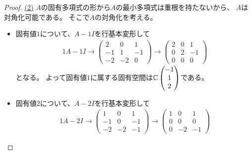 \documentclass[report]{jlreq}
\begin{document}
\begin{proof}
    \uline{(2)} \quad
    $A$の固有多項式の形から$A$の最小多項式は重根を持たないから、
    $A$は対角化可能である。
    そこで$A$の対角化を考える。
    \begin{itemize}
        \item 固有値$1$について、$A - 1I$を行基本変形して
            \begin{alignat}{1}
                A - 1I
                    \rightarrow
                        \begin{pmatrix}
                            2 & 0 & 1 \\
                            -1 & 1 & -1 \\
                            -2 & -2 & 0
                        \end{pmatrix}
                    \rightarrow
                        \begin{pmatrix}
                            2 & 0 & 1 \\
                            0 & 2 & -1 \\
                            0 & 0 & 0
                        \end{pmatrix}
            \end{alignat}
            となる。
            よって固有値$1$に属する固有空間は$\mathbb{C} \begin{pmatrix}
                -1 \\ 1 \\ 2
            \end{pmatrix}$である。
        \item 固有値$2$について、$A - 2I$を行基本変形して
            \begin{alignat}{1}
                A - 2I
                    \rightarrow
                        \begin{pmatrix}
                            1 & 0 & 1 \\
                            -1 & 0 & -1 \\
                            -2 & -2 & -1
                        \end{pmatrix}
                    \rightarrow
                        \begin{pmatrix}
                            1 & 0 & 1 \\
                            0 & 0 & 0 \\
                            0 & -2 & -1
                        \end{pmatrix}
            \end{alignat}

\end{itemize}
\end{proof}
\end{document}
